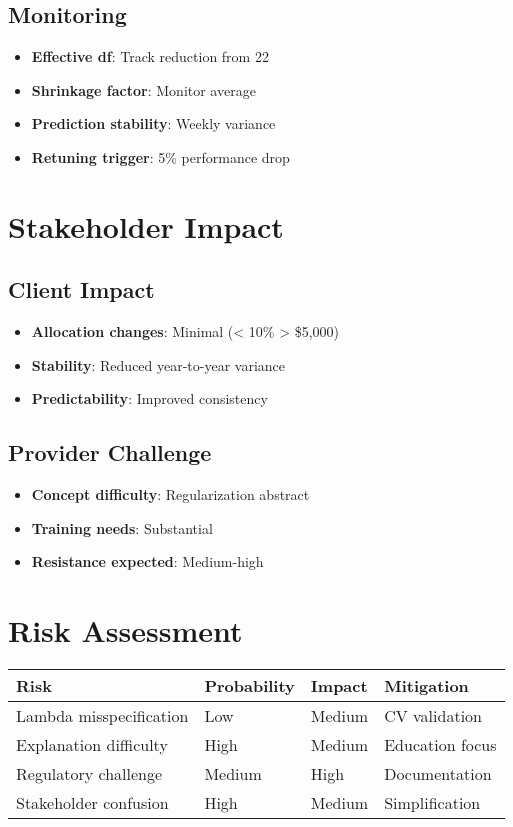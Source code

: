 \subsection{Monitoring}

\begin{itemize}
    \item \textbf{Effective df}: Track reduction from 22
    \item \textbf{Shrinkage factor}: Monitor average
    \item \textbf{Prediction stability}: Weekly variance
    \item \textbf{Retuning trigger}: 5\% performance drop
\end{itemize}

\section{Stakeholder Impact}

\subsection{Client Impact}

\begin{itemize}
    \item \textbf{Allocation changes}: Minimal (< 10\% > \$5,000)
    \item \textbf{Stability}: Reduced year-to-year variance
    \item \textbf{Predictability}: Improved consistency
\end{itemize}

\subsection{Provider Challenge}

\begin{itemize}
    \item \textbf{Concept difficulty}: Regularization abstract
    \item \textbf{Training needs}: Substantial
    \item \textbf{Resistance expected}: Medium-high
\end{itemize}

\section{Risk Assessment}

\begin{center}
\begin{tabular}{llll}
\toprule
Risk & Probability & Impact & Mitigation \\
\midrule
Lambda misspecification & Low & Medium & CV validation \\
Explanation difficulty & High & Medium & Education focus \\
Regulatory challenge & Medium & High & Documentation \\
Stakeholder confusion & High & Medium & Simplification \\
\bottomrule
\end{tabular}
\end{center}

